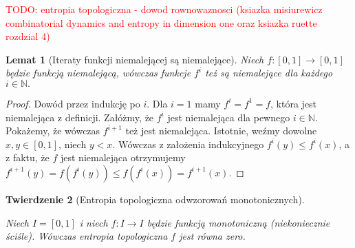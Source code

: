\documentclass[licencjacka]{pwr_wmat_praca_dyplomowa}
\theoremstyle{plain}
\newtheorem{theorem}{Twierdzenie}
\numberwithin{theorem}{chapter}
\newtheorem{lemma}[theorem]{Lemat}
\theoremstyle{definition}
\numberwithin{theorem}{chapter}
\begin{document}
\textcolor{red}{TODO: entropia topologiczna - dowod rownowaznosci
 (ksiazka misiurewicz combinatorial dynamics and entropy in dimension one oraz ksiazka ruette rozdzial 4)}
 
 
\begin{lemma}[Iteraty funkcji niemalejącej są niemalejące]
\label{iteraty_niemalejacych_sa_niemalejace}
Niech $f: [0, 1] \rightarrow [0, 1]$ będzie funkcją niemalejącą, wówczas funkcje $f^{i}$ też są niemalejące dla każdego $i \in \mathbb{N}.$ 
\end{lemma}

\begin{proof}
Dowód przez indukcję po $i$. Dla $i=1$ mamy $f^i = f^1 = f$, która jest niemalejąca z definicji.
Załóżmy, że $f^i$ jest niemalejąca dla pewnego $i \in \mathbb{N}$. Pokażemy, że wówczas $f^{i+1}$ też jest niemalejąca. Istotnie, weźmy dowolne $x, y \in [0,1]$, niech $y < x$. Wówczas z założenia indukcyjnego $f^i(y) \leq f^i(x)$, a z faktu, że $f$ jest niemalejąca otrzymujemy $f^{i+1}(y)= f(f^i(y)) \leq f(f^i(x)) = f^{i+1}(x).$
\end{proof}
 
 
\begin{theorem}[Entropia topologiczna odwzorowań monotonicznych]
\label{entropia_topologiczna_odwzorowan_monotonicznych}

Niech $I = [0, 1]$ i niech $f: I \rightarrow I$ będzie funkcją monotoniczną (niekoniecznie ściśle).
Wówczas entropia topologiczna $f$ jest równa zero.
\end{theorem}
\end{document}

